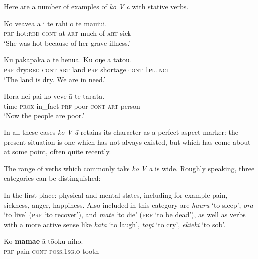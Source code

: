 Here are a number of examples of \textit{ko V {\ꞌ}ā} with stative verbs.

\ea\label{ex:7.62}
\gll Ko ve{\ꞌ}ave{\ꞌ}a {\ꞌ}ā {\ꞌ}i te rahi o te māuiui. \\
\textsc{prf} hot:\textsc{red} \textsc{cont} at \textsc{art} much of \textsc{art} sick \\

\glt 
‘She was hot because of her grave illness.’ \textstyleExampleref{[R229.229]} 
\z

\ea\label{ex:7.63}
\gll Ku pakapaka {\ꞌ}ā te henua. Ku oŋe {\ꞌ}ā tātou. \\
\textsc{prf} dry:\textsc{red} \textsc{cont} \textsc{art} land \textsc{prf} shortage \textsc{cont} \textsc{1pl.incl} \\

\glt 
‘The land is dry. We are in need.’ \textstyleExampleref{[R352.116]} 
\z

\ea\label{ex:7.64}
\gll Hora nei pa{\ꞌ}i ko veve {\ꞌ}ā te taŋata. \\
time \textsc{prox} in\_fact \textsc{prf} poor \textsc{cont} \textsc{art} person \\

\glt
‘Now the people are poor.’ \textstyleExampleref{[R250.128]} 
\z

In all these cases \textit{ko V {\ꞌ}ā} retains its character as a perfect aspect marker: the present situation is one which has not always existed, but which has come about at some point, often quite recently. 

The range of verbs which commonly take \textit{ko V {\ꞌ}ā} is wide. Roughly speaking, three categories can be distinguished:

In the first place: physical and mental states, including for example pain, sickness, anger, happiness. Also included in this category are \textit{ha{\ꞌ}uru} ‘to sleep’, \textit{ora} ‘to live’ (\textsc{prf} ‘to recover’), and \textit{mate} ‘to die’ (\textsc{prf} ‘to be dead’), as well as verbs with a more active sense like \textit{kata} ‘to laugh’, \textit{taŋi} ‘to cry’, \textit{{\ꞌ}eki{\ꞌ}eki} ‘to sob’.

\ea\label{ex:7.65}
\gll Ko \textbf{mamae} {\ꞌ}ā tō{\ꞌ}oku niho. \\
\textsc{prf} pain \textsc{cont} \textsc{poss.1sg.o} tooth \\

